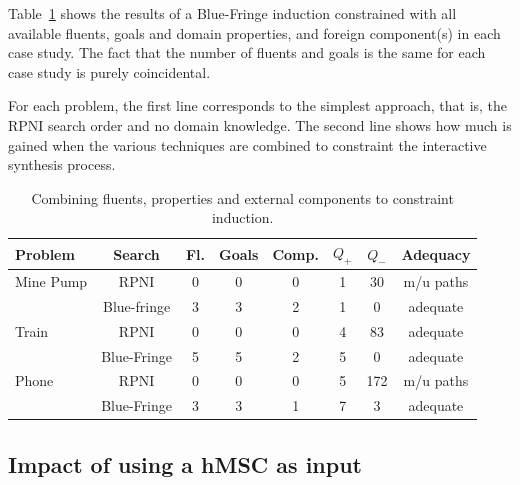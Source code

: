 Table~\ref{All:res} shows the results of a Blue-Fringe induction constrained with all available fluents, goals and domain properties, and foreign component(s) in each case study. The fact that the number of fluents and goals is the same for each case study is purely coincidental. 

For each problem, the first line corresponds to the simplest approach, that is, the RPNI search order and no domain knowledge. The second line shows how much is gained when the various techniques are combined to constraint the interactive synthesis process.

\begin{table}[H]
\centering
\begin{small}
\begin{tabular}{|l||c|c|c|c||c|c|c|}\hline
Problem   & Search      & Fl. & Goals & Comp. &$Q_+$&$Q_-$& Adequacy\\\hline\hline
Mine Pump & RPNI        & 0   & 0     & 0     & 1   & 30  & m/u paths\\\cline{2-8}
          & Blue-fringe & 3   & 3     & 2     & 1   & 0   & adequate\\\hline\hline
Train     & RPNI        & 0   & 0     & 0     & 4   & 83  & adequate\\\cline{2-8}
          & Blue-Fringe & 5   & 5     & 2     & 5   & 0   & adequate\\\hline\hline
Phone     & RPNI        & 0   & 0     & 0     & 5   & 172 & m/u paths\\\cline{2-8}
          & Blue-Fringe & 3   & 3     & 1     & 7   & 3   & adequate\\\hline
\end{tabular}
\end{small}
\caption{Combining fluents, properties and external components to constraint induction\label{All:res}.}
\end{table}


\subsection{Impact of using a hMSC as input\label{subsection:evaluation-casestudies-asm}}

